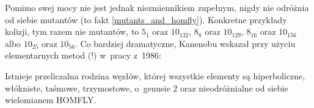 Pomimo swej mocy nie jest jednak niezmiennikiem zupełnym, nigdy nie odróżnia od siebie mutantów (to fakt \ref{mutants_and_homfly}).
Konkretne przykłady kolizji, tym razem nie mutantów, to $5_1$ oraz $10_{132}$, $8_{8}$ oraz $10_{129}$, $8_{16}$ oraz $10_{156}$ albo $10_{25}$ oraz $10_{56}$.
Co bardziej dramatyczne, Kanenobu wskazał przy użyciu elementarnych metod (!) w~pracy \cite{kanenobu86} z~1986:

\begin{proposition}
    Istnieje przeliczalna rodzina węzłów, której wszystkie elementy są hiperboliczne, włókniste, taśmowe, trzymostowe, o~genusie 2 oraz nieodróżnialne od siebie wielomianem HOMFLY.
\end{proposition}

